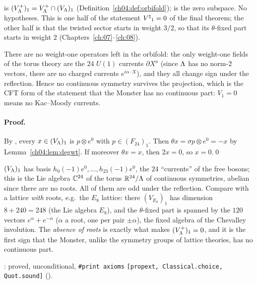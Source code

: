 \begin{dictionary}
 is $(V_{\Lambda}^+)_1=V_{\Lambda}^+\cap(V_{\Lambda})_1$ (Definition~\ref{ch04:def:orbifold});
 is the zero subspace. No hypotheses. This is one half of the statement ${V^{\natural}}_1=0$ of the
final theorem; the other half is that the twisted sector starts in weight $3/2$, so that its
$\theta$-fixed part starts in weight $2$ (Chapters~\ref{ch:07}--\ref{ch:08}).
\end{dictionary}

\begin{physics}
There are no weight-one operators left in the orbifold: the only weight-one fields of the torus theory are the $24$ $U(1)$ currents $\partial X^a$ (since ${\Lambda}$ has no norm-$2$ vectors, there are no charged currents $e^{i\alpha\cdot X}$), and they all change sign under the reflection. Hence no continuous symmetry survives the projection, which is the CFT form of the statement that the Monster has no continuous part: $V_1=0$ means no Kac--Moody currents.
\end{physics}

\paragraph{Proof.} By , every $x\in(V_{\Lambda})_1$ is $p\otimes e^0$ with
$p\in(F_{24})_1$. Then $\theta x=\sigma p\otimes e^0=-x$ by Lemma~\ref{ch04:lem:degwt}. If moreover
$\theta x=x$, then $2x=0$, so $x=0$.\qed

\begin{example}
$(V_{\Lambda})_1$ has basis $h_0(-1)e^0,\dots,h_{23}(-1)e^0$, the $24$ ``currents'' of the free bosons;
this is the Lie algebra ${\mathbb{C}}^{24}$ of the torus $\mathbb{R}^{24}/{\Lambda}$ of continuous symmetries, abelian
since there are no roots. All of them are odd under the reflection. Compare with a lattice
\emph{with} roots, e.g.\ the $E_8$ lattice: there $(V_{E_8})_1$ has dimension $8+240=248$ (the Lie
algebra $E_8$), and the $\theta$-fixed part is spanned by the $120$ vectors $e^\alpha+e^{-\alpha}$
($\alpha$ a root, one per pair $\pm\alpha$), the fixed algebra of the Chevalley involution. The
\emph{absence of roots} is exactly what makes $(V_{\Lambda}^+)_1=0$, and it is the first sign that the
Monster, unlike the symmetry groups of lattice theories, has no continuous part.
\end{example}

\begin{status}
: proved, unconditional, \texttt{\#print axioms}
\texttt{[propext, Classical.choice, Quot.sound]} ().
\end{status}
